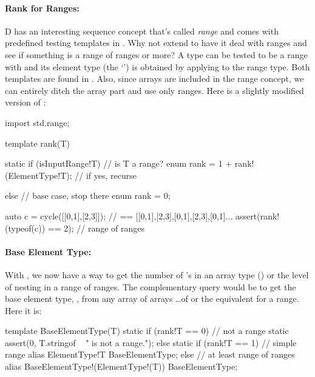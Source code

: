 \paragraph{Rank for Ranges:}\label{rankforranges}

D has an interesting sequence concept that's called \emph{range} and comes with predefined testing templates in . Why not extend  to have it deal with ranges and see if something is a range of ranges or more? A type can be tested to be a range with  and its element type (the `') is obtained by applying  to the range type. Both templates are found in . Also, since arrays are included in the range concept, we can entirely ditch the array part and use only ranges. Here is a slightly modified version of :

\begin{dcode}
import std.range;

template rank(T)
{
    static if (isInputRange!T)                // is T a range?
        enum rank = 1 + rank!(ElementType!T); // if yes, recurse

    else                                      // base case, stop there
        enum rank = 0; 
}

auto c = cycle([[0,1],[2,3]]); // == [[0,1],[2,3],[0,1],[2,3],[0,1]...
assert(rank!(typeof(c)) == 2); // range of ranges 
\end{dcode}

\paragraph{Base Element Type:}

With , we now have a way to get the number of \DD{[]}'s in an array type () or the level of nesting in a range of ranges. The complementary query would be to get the base element type, , from any array of arrays \ldots of  or the equivalent for a range. Here it is:

\begin{ndcode}
template BaseElementType(T)
{
    static if (rank!T == 0)      // not a range
        static assert(0, T.stringof ~ " is not a range.");
    else static if (rank!T == 1) // simple range
        alias ElementType!T                     BaseElementType;
    else                         // at least range of ranges
        alias BaseElementType!(ElementType!(T)) BaseElementType;
}        
\end{ndcode}


